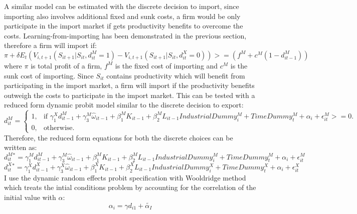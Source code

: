 \documentclass[11pt]{article}
\begin{document}
A similar model can be estimated with the discrete decision to import,
since importing also involves additional fixed and sunk costs, a firm
would be only participate in the import market if gets productivity
benefits to overcome the costs. Learning-from-importing has been
demonstrated in the previous section, therefore a firm will import if:
\begin{equation}
\pi  +
\delta E_{t}(V_{i,t+1}(S_{it+1}|S_{it},d_{it}^{M}=1) -
V_{i,t+1}(S_{it+1}|S_{it},d_{it}^{X}=0) ) >=  (f^{M} + c^{M}(1-d_{it-1}^{M}))
\end{equation}
where $\pi$ is total profit of a firm, $f^{M}$ is the fixed cost of
importing and  $c^{M}$ is the sunk cost of importing.
Since $S_{it}$ contains productivity which will benefit from
participating in the import market, a firm will import if the
productivity benefits outweigh the costs to participate in the import
market. This can be tested with a reduced form dynamic probit model similar to
the discrete decision to export: 
\begin{equation}
  d_{it}^{M}=\begin{cases}
   1 , & \text{if $\gamma_{1}^{X} d_{it-1}^{M} + 
\gamma_{3}^{M} \hat{\omega}_{it-1}  + \beta_{1}^{M}K_{it-1}  +\beta_{2}^{M}L_{it-1}
IndustrialDummy_{i}^{M} + TimeDummy_{t}^{M}  + \alpha_{i}+\epsilon_{it}^{M}>= 0   $}.\\
   0 , & \text{otherwise}.
  \end{cases}
\end{equation}
Therefore, the reduced form equations for both the discrete choices
can be written as:
\begin{equation}
d_{it}^{M}^{*} = \gamma_{1}^{M} d_{it-1}^{M} + 
\gamma_{3}^{M} \hat{\omega}_{it-1}  + \beta_{1}^{M}K_{it-1}  +\beta_{2}^{M}L_{it-1}
IndustrialDummy_{i}^{M} + TimeDummy_{t}^{M}  + \alpha_{i}+\epsilon_{it}^{M}
\end{equation}
\begin{equation}
d_{it}^{X}^{*} = \gamma_{1}^{X} d_{it-1}^{X} + 
\gamma_{3}^{X} \hat{\omega}_{it-1}  + \beta_{1}^{X}K_{it-1}  +\beta_{2}^{X}L_{it-1}
IndustrialDummy_{i}^{X} + TimeDummy_{t}^{X}  + \alpha_{i}+\epsilon_{it}^{X}
\end{equation}
I use the dynamic random effects probit specification with Wooldridge
method which treats the intial conditions problem by accounting for
the correlation of the initial value with $\alpha$:
$$  \alpha_{i}= \gamma d_{i1}+ \tilde{\alpha_{I}} $$
\begin{center}

\end{center}
\end{document}
